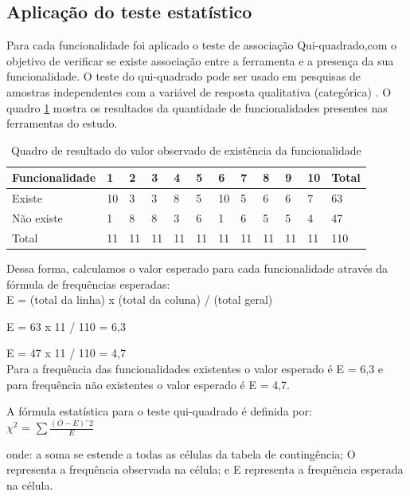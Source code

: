\subsection{Aplicação do teste estatístico}

Para cada funcionalidade foi aplicado o teste de associação Qui-quadrado,com o objetivo de verificar se existe associação entre a ferramenta e a presença da sua funcionalidade. O teste do qui-quadrado pode ser usado em pesquisas de amostras independentes com a variável de resposta qualitativa (categórica) \cite{barbetta:2012}. O quadro \ref{distribuicao} mostra os resultados da quantidade de funcionalidades presentes nas ferramentas do estudo.

\begin{table}[h]
	\centering
	\caption{Quadro de resultado do valor observado de existência da funcionalidade}
	\label{distribuicao}
	\begin{tabular}{|l|l|l|l|l|l|l|l|l|l|l|l|}
		\hline
		Funcionalidade & 1 & 2 & 3 & 4 & 5 & 6 & 7 & 8 & 9 & 10 & Total \\ \hline
		Existe & 10 & 3 & 3 & 8 & 5 & 10 & 5 & 6 & 6 & 7 & 63 \\ \hline
		Não existe & 1 & 8 & 8 & 3 & 6 & 1 & 6 & 5 & 5 & 4 & 47 \\ \hline
		Total & 11 & 11 & 11 & 11 & 11 & 11 & 11 & 11 & 11 & 11 & 110 \\ \hline
	\end{tabular}
\end{table}

Dessa forma, calculamos o valor esperado para cada funcionalidade através da fórmula de frequências esperadas:
\\

E = (total da linha) x (total da coluna) / (total geral)

E = 63 x 11 / 110 = 6,3

E = 47 x 11 / 110 = 4,7
\\

Para a frequência das funcionalidades existentes o valor esperado é E = 6,3 e para frequência não existentes o valor esperado é E = 4,7.


A fórmula estatística para o teste qui-quadrado é definida por:
\\


 $ \chi^2 $ = $\sum \frac{(O-E)ˆ2}{E}$


 onde:
 a soma se estende a todas as células da tabela de contingência; 
 O representa a frequência observada na célula; e
 E representa a frequência esperada na célula.

